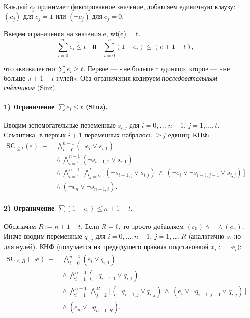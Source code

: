 Каждый $c_j$ принимает фиксированное значение, добавляем единичную клаузу: $(c_j)$ для $c_j{=}1$ или $(\neg c_j)$ для $c_j{=}0$.

Введем ограничения на значения e, wt(e) = t. 
\[
\sum_{i=0}^{n} e_i \le t
\quad\text{и}\quad
\sum_{i=0}^{n} (1-e_i) \le (n{+}1 - t),
\]

что эквивалентно \(\sum e_i \ge t\).
Первое — «не больше t единиц», второе — «не больше \(n{+}1{-}t\) нулей».
Оба ограничения кодируем \emph{последовательным счётчиком} (Sinz).

\paragraph{1) Ограничение \(\sum e_i \le t\) (Sinz).}
Вводим вспомогательные переменные \(s_{i,j}\) для \(i=0,\ldots,n-1\), \(j=1,\ldots,t\).
Семантика: в первых \(i{+}1\) переменных набралось \(\ge j\) единиц.
КНФ:
\[
\begin{aligned}
\mathrm{SC}_{\le t}(e)\ \equiv\ 
&\bigwedge_{i=0}^{n-1} (\neg e_i \lor s_{i,1})
\\
&\land\ \bigwedge_{i=1}^{n-1} (\neg s_{i-1,1} \lor s_{i,1})
\\
&\land\ \bigwedge_{i=1}^{n-1}\ \bigwedge_{j=2}^{t}
\Big[\,(\neg s_{i-1,j} \lor s_{i,j}) \ \land\ (\neg e_i \lor \neg s_{i-1,j-1} \lor s_{i,j})\,\Big]
\\
&\land\ (\neg e_n \lor \neg s_{n-1,t}).
\end{aligned}
\]

\paragraph{2) Ограничение \(\sum (1-e_i) \le n{+}1{-}t\).}
Обозначим \(R:=n{+}1{-}t\).
Если \(R=0\), то просто добавляем \((e_0)\land\cdots\land(e_n)\).
Иначе вводим переменные \(q_{i,j}\) для \(i=0,\ldots,n-1\), \(j=1,\ldots,R\) (аналогично \(s\), но для нулей).
КНФ (получается из предыдущего правила подстановкой \(x_i:=\neg e_i\)):
\[
\begin{aligned}
\mathrm{SC}_{\le R}(\neg e)\ \equiv\ 
&\bigwedge_{i=0}^{n-1} (e_i \lor q_{i,1})
\\
&\land\ \bigwedge_{i=1}^{n-1} (\neg q_{i-1,1} \lor q_{i,1})
\\
&\land\ \bigwedge_{i=1}^{n-1}\ \bigwedge_{j=2}^{R}
\Big[\,(\neg q_{i-1,j} \lor q_{i,j}) \ \land\ (e_i \lor \neg q_{i-1,j-1} \lor q_{i,j})\,\Big]
\\
&\land\ (e_n \lor \neg q_{n-1,R}).
\end{aligned}
\]

